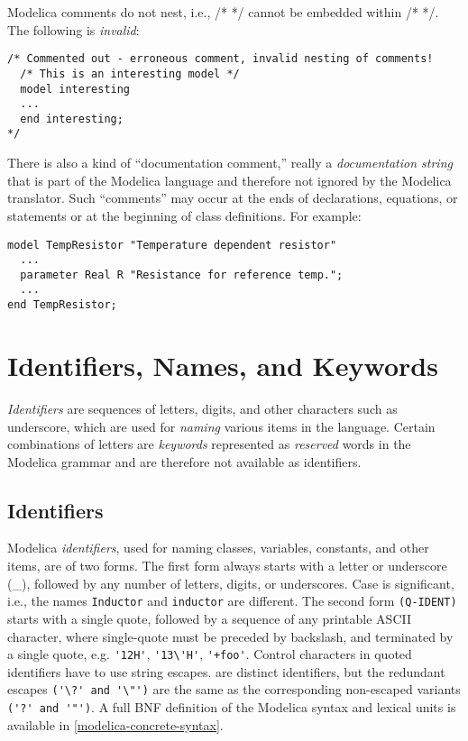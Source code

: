 Modelica comments do not nest, i.e., /* */ cannot be embedded within /*
*/. The following is \emph{invalid}:
\begin{lstlisting}[language=modelica]
/* Commented out - erroneous comment, invalid nesting of comments!
  /* This is an interesting model */
  model interesting
  ...
  end interesting;
*/
\end{lstlisting}

There is also a kind of ``documentation comment,'' really a
\emph{documentation string} that is part of the Modelica language and
therefore not ignored by the Modelica translator. Such ``comments'' may
occur at the ends of declarations, equations, or statements or at the
beginning of class definitions. For example:

\begin{lstlisting}[language=modelica]
model TempResistor "Temperature dependent resistor"
  ...
  parameter Real R "Resistance for reference temp.";
  ...
end TempResistor;
\end{lstlisting}

\section{Identifiers, Names, and Keywords}

\emph{Identifiers} are sequences of letters, digits, and other
characters such as underscore, which are used for \emph{naming} various
items in the language. Certain combinations of letters are
\emph{keywords} represented as \emph{reserved} words in the Modelica
grammar and are therefore not available as identifiers.

\subsection{Identifiers}

Modelica \emph{identifiers}, used for naming classes, variables,
constants, and other items, are of two forms. The first form always
starts with a letter or underscore (\_), followed by any number of
letters, digits, or underscores. Case is significant, i.e., the names
\lstinline[basicstyle=\ttfamily]!Inductor! and \lstinline[basicstyle=\ttfamily]!inductor! are different. The second form \lstinline[basicstyle=\ttfamily]!(Q-IDENT)! starts
with a single quote, followed by a sequence of any printable ASCII
character, where single-quote must be preceded by backslash, and
terminated by a single quote, e.g. \lstinline[basicstyle=\ttfamily]!'12H'!, \lstinline[basicstyle=\ttfamily]!'13\'H'!,
\lstinline[basicstyle=\ttfamily]!'+foo'!. Control characters in quoted identifiers have to use string
escapes. %
are distinct identifiers, but the redundant escapes \lstinline[basicstyle=\ttfamily]!('\?' and '\"')! are the same as the corresponding non-escaped
variants \lstinline[basicstyle=\ttfamily]!('?' and '"')!. A full BNF definition of the Modelica syntax and
lexical units is available in \autoref{modelica-concrete-syntax}.

